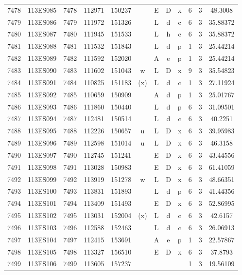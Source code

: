 \begin{tabular}{|*{12}{c|}}
7478 & 113ES085 & 7478 & 112971 & 150237 &  & E & D & x & 6 & 3 & 48.3008 \\ 
7479 & 113ES086 & 7479 & 111972 & 151326 &  & L & d & c & 6 & 3 & 35.88372 \\ 
7480 & 113ES087 & 7480 & 111945 & 151533 &  & L & h & c & 6 & 3 & 35.88372 \\ 
7481 & 113ES088 & 7481 & 111532 & 151843 &  & L & d & p & 1 & 3 & 25.44214 \\ 
7482 & 113ES089 & 7482 & 111592 & 152020 &  & A & e & p & 1 & 3 & 25.44214 \\ 
7483 & 113ES090 & 7483 & 111602 & 151043 & w & L & D & x & 9 & 3 & 35.54823 \\ 
7484 & 113ES091 & 7484 & 110825 & 151183 & (x) & L & d & c & 1 & 3 & 27.11924 \\ 
7485 & 113ES092 & 7485 & 110659 & 150909 &  & A & d & p & 1 & 3 & 25.01767 \\ 
7486 & 113ES093 & 7486 & 111860 & 150440 &  & L & d & p & 6 & 3 & 31.09501 \\ 
7487 & 113ES094 & 7487 & 112481 & 150514 &  & L & d & c & 6 & 3 & 40.2251 \\ 
7488 & 113ES095 & 7488 & 112226 & 150657 & u & L & D & x & 6 & 3 & 39.95983 \\ 
7489 & 113ES096 & 7489 & 112598 & 151014 & u & L & D & x & 6 & 3 & 46.3158 \\ 
7490 & 113ES097 & 7490 & 112745 & 151241 &  & E & D & x & 6 & 3 & 43.44556 \\ 
7491 & 113ES098 & 7491 & 113028 & 150983 &  & E & D & x & 6 & 3 & 61.41059 \\ 
7492 & 113ES099 & 7492 & 113919 & 151278 & w & L & D & x & 6 & 3 & 48.66351 \\ 
7493 & 113ES100 & 7493 & 113831 & 151893 &  & L & d & p & 6 & 3 & 41.44356 \\ 
7494 & 113ES101 & 7494 & 113409 & 151493 &  & E & D & x & 6 & 3 & 52.86995 \\ 
7495 & 113ES102 & 7495 & 113031 & 152004 & (x) & L & d & c & 6 & 3 & 42.6157 \\ 
7496 & 113ES103 & 7496 & 112588 & 152463 &  & L & d & c & 6 & 3 & 26.06913 \\ 
7497 & 113ES104 & 7497 & 112415 & 153691 &  & A & e & p & 1 & 3 & 22.57867 \\ 
7498 & 113ES105 & 7498 & 113327 & 156510 &  & E & D & x & 6 & 3 & 37.8793 \\ 
7499 & 113ES106 & 7499 & 113605 & 157237 &  &  &  &  & 1 & 3 & 19.56109 \\ 

\end{tabular}
